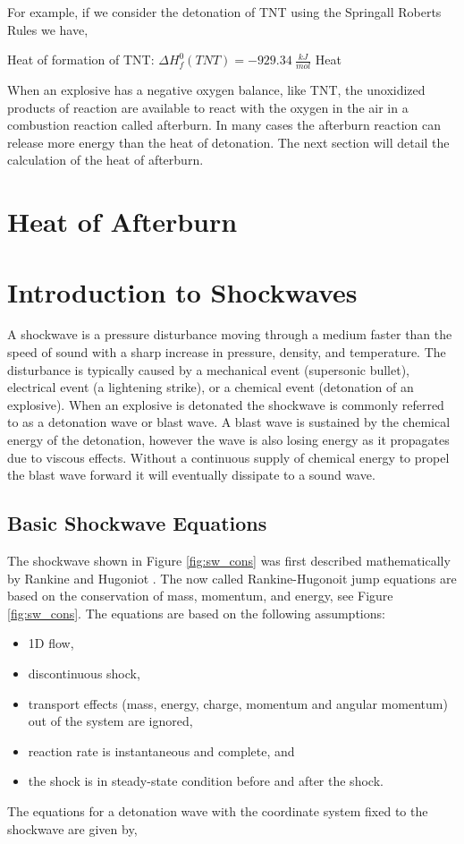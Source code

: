 For example, if we consider the detonation of TNT using the Springall Roberts Rules we have,

Heat of formation of TNT: $\Delta H^0_f(TNT) = -929.34\:\frac{kJ}{mol}$
Heat

When an explosive has a negative oxygen balance, like TNT, the unoxidized products of reaction are available to react with the oxygen in the air in a combustion reaction called afterburn.  In many cases the afterburn reaction can release more energy than the heat of detonation.  The next section will detail the calculation of the heat of afterburn.
\section{Heat of Afterburn}

\section{Introduction to Shockwaves}
A shockwave is a pressure disturbance moving through a medium faster than the speed of sound with a sharp increase in pressure, density, and temperature.  The disturbance is typically caused by a mechanical event (supersonic bullet), electrical event (a lightening strike), or a chemical event (detonation of an explosive).  When an explosive is detonated the shockwave is commonly referred to as a detonation wave or blast wave.  A blast wave is sustained by the chemical energy of the detonation, however the wave is also losing energy as it propagates due to viscous effects.  Without a continuous supply of  chemical energy to propel the blast wave forward it will eventually dissipate to a sound wave.

\subsection{Basic Shockwave Equations}
The shockwave shown in Figure \ref{fig:sw_cons} was first described mathematically by Rankine and Hugoniot \cite{Rankine1870}\cite{Hugoniot1889}\cite{johnson1998}.  The now called Rankine-Hugonoit jump equations are based on the conservation of mass, momentum, and energy, see Figure \ref{fig:sw_cons}.  The equations are based on the following assumptions:
\begin{itemize}
\item 1D flow,
\item discontinuous shock,
\item transport effects (mass, energy, charge, momentum and angular momentum) out of the system are ignored,
\item reaction rate is instantaneous and complete, and
\item the shock is in steady-state condition before and after the shock.
\end{itemize}
The equations for a detonation wave with the coordinate system fixed to the shockwave are given by,

